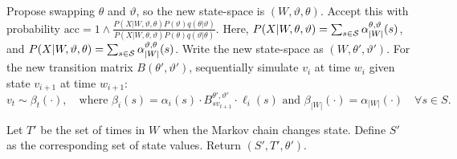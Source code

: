 \begin{algorithm}
\begin{algorithmic}[1]
    Propose swapping $\theta$ and $\vartheta$, so the new state-space is $(W,\vartheta,\theta)$. 
     Accept this with probability 
     $
     \text{acc} 
        =  1 \wedge \frac{P(X| W,\vartheta,\theta)P(\vartheta)q(\theta|\vartheta)}
        {P(X| W,\theta, \vartheta)P(\theta) q(\vartheta|\theta)}.
        $
        Here, $P(X|W,\theta,\vartheta) = \sum_{s \in {\mathcal S}} \alpha^{\theta,\vartheta}_{|W|}(s)$, and $P(X|W,\vartheta,\theta) = \sum_{s \in {\mathcal S}} \alpha^{\vartheta,\theta}_{|W|}(s)$.
    \State Write the new state-space as $(W,\theta',\vartheta')$.
    For the new transition matrix $B(\theta',\vartheta')$,     sequentially simulate $v_i$ at time $w_i$ given state $v_{i+1}$  at time $w_{i+1}$:
    $$ v_t \sim \beta_t(\cdot),\quad \text{where } 
    \beta_i(s) = \alpha_i(s)\cdot B^{\theta',\vartheta'}_{sv_{t+1}} \cdot \ell_i(s) \text{ \ and \ } \beta_{|W|}(\cdot) = \alpha_{|W|}(\cdot) \quad \forall s \in S.$$
    
    \State Let $T'$ be the set of times in $W$ when the Markov chain changes state. Define $S'$ as the corresponding set of state values. Return $(S', T', \theta')$.
\end{algorithmic}
\end{algorithm}


